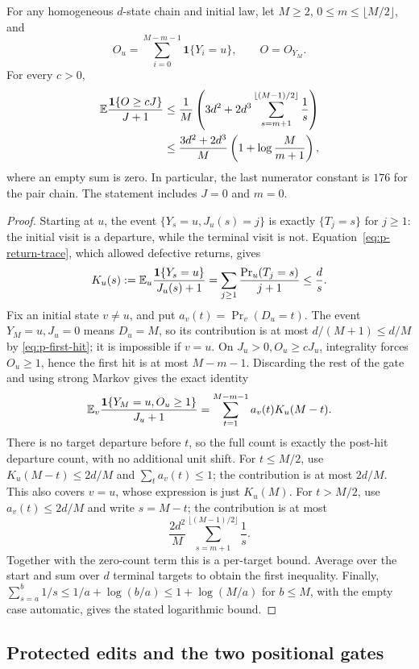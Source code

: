 \begin{lemma}\label{lem:old-inverse}
For any homogeneous $d$-state chain and initial law, let $M\ge2$,
$0\le m\le\lfloor M/2\rfloor$, and
\[
 O_u=\sum_{i=0}^{M-m-1}\mathbf1\{Y_i=u\},\qquad O=O_{Y_M}.
\]
For every $c>0$,
\begin{align*}
 \mathbb E\frac{\mathbf1\{O\ge cJ\}}{J+1}
 &\le\frac1M\left(3d^2+2d^3
     \sum_{s=m+1}^{\lfloor(M-1)/2\rfloor}\frac1s\right)\\
 &\le\frac{3d^2+2d^3}{M}
       \left(1+\log\frac M{m+1}\right),
\end{align*}
where an empty sum is zero.  In particular, the last numerator constant
is $176$ for the pair chain.  The statement includes $J=0$ and $m=0$.
\end{lemma}
\begin{proof}
Starting at $u$, the event
$\{Y_s=u,J_u(s)=j\}$ is exactly $\{T_j=s\}$ for $j\ge1$:
the initial visit is a departure, while the terminal visit is not.
Equation~\eqref{eq:p-return-trace}, which allowed defective returns, gives
\[
 K_u(s):=\mathbb E_u\frac{\mathbf1\{Y_s=u\}}{J_u(s)+1}
 =\sum_{j\ge1}\frac{\Pr_u(T_j=s)}{j+1}\le\frac ds.
\]
Fix an initial state $v\ne u$, and put
$a_v(t)=\Pr_v(D_u=t)$.  The event $Y_M=u,J_u=0$ means $D_u=M$,
so its contribution is at most $d/(M+1)\le d/M$ by
\eqref{eq:p-first-hit}; it is impossible if $v=u$.
On $J_u>0,O_u\ge cJ_u$, integrality forces $O_u\ge1$, hence the first
hit is at most $M-m-1$.  Discarding the rest of the gate and using
strong Markov gives the exact identity
\[
 \mathbb E_v\frac{\mathbf1\{Y_M=u,O_u\ge1\}}{J_u+1}
 =\sum_{t=1}^{M-m-1}a_v(t)K_u(M-t).
\]
There is no target departure before $t$, so the full count is exactly
the post-hit departure count, with no additional unit shift.
For $t\le M/2$, use $K_u(M-t)\le2d/M$ and
$\sum_ta_v(t)\le1$; the contribution is at most $2d/M$.
This also covers $v=u$, whose expression is just $K_u(M)$.
For $t>M/2$, use $a_v(t)\le2d/M$ and write $s=M-t$;
the contribution is at most
\[
 \frac{2d^2}{M}\sum_{s=m+1}^{\lfloor(M-1)/2\rfloor}\frac1s.
\]
Together with the zero-count term this is a per-target bound.
Average over the start and sum over $d$ terminal targets to obtain the
first inequality.  Finally,
$\sum_{s=a}^b1/s\le1/a+\log(b/a)\le1+\log(M/a)$ for $b\le M$,
with the empty case automatic, gives the stated logarithmic bound.
\end{proof}

\subsection{Protected edits and the two positional gates}

